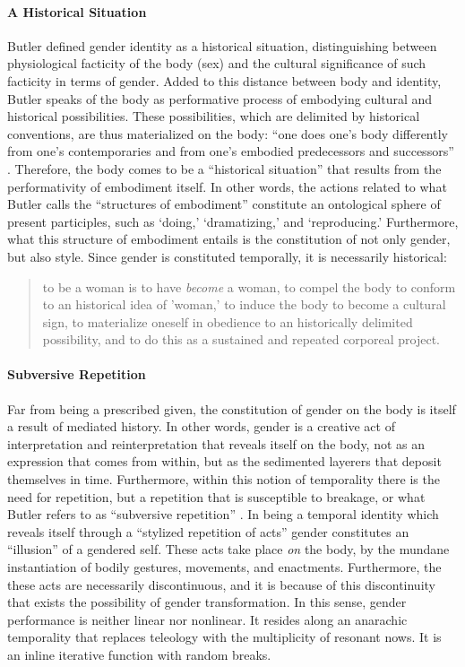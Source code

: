 \paragraph{A Historical Situation}
Butler defined gender identity as a historical situation, distinguishing between physiological facticity of the body (sex) and the cultural significance of such facticity in terms of gender. Added to this distance between body and identity, Butler speaks of the body as performative process of embodying cultural and historical possibilities. These possibilities, which are delimited by historical conventions, are thus materialized on the body: ``one does one's body differently from one's contemporaries and from one's embodied predecessors and successors'' \parencite[521]{But88:Per}. Therefore, the body comes to be a ``historical situation'' that results from the performativity of embodiment itself. In other words, the actions related to what Butler calls the ``structures of embodiment'' constitute an ontological sphere of present participles, such as `doing,' `dramatizing,' and `reproducing.' Furthermore, what this structure of embodiment entails is the constitution of not only gender, but also style. Since gender is constituted temporally, it is necessarily historical:

\begin{quote}
	to be a woman is to have \textit{become} a woman, to compel the body to conform to an historical idea of 'woman,' to induce the body to become a cultural sign, to materialize oneself in obedience to an historically delimited possibility, and to do this as a sustained and repeated corporeal project. \parencite[521]{But88:Per}
\end{quote}

\paragraph{Subversive Repetition}
Far from being a prescribed given, the constitution of gender on the body is itself a result of mediated history. In other words, gender is a creative act of interpretation and reinterpretation that reveals itself on the body, not as an expression that comes from within, but as the sedimented layerers that deposit themselves in time. Furthermore, within this notion of temporality there is the need for repetition, but a repetition that is susceptible to breakage, or what Butler refers to as ``subversive repetition'' \parencite[520]{But88:Per}. In being a temporal identity which reveals itself through a ``stylized repetition of acts'' gender constitutes an ``illusion'' of a gendered self. These acts take place \textit{on} the body, by the mundane instantiation of bodily gestures, movements, and enactments. Furthermore, the these acts are necessarily discontinuous, and it is because of this discontinuity that exists the possibility of gender transformation. In this sense, gender performance is neither linear nor nonlinear. It resides along an anarachic temporality that replaces teleology with the multiplicity of resonant nows. It is an inline iterative function with random breaks. 

